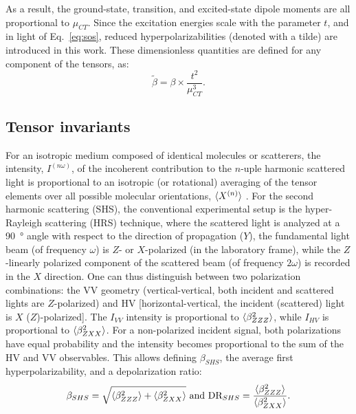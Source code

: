 \documentclass[journal=jpcafh]{achemso}
\begin{document}
As a result, the ground-state, transition, and excited-state dipole moments are all proportional to $ \mu_{CT}$. Since the excitation energies scale with the parameter $t$, and in light of Eq.~\eqref{eq:sos}, reduced hyperpolarizabilities (denoted with a tilde) are introduced in this work. These dimensionless quantities are defined for any component of the tensors, as:
\begin{equation}
	\tilde\beta = \beta \times \frac{t^2}{\mu_{CT}^3}. \label{eq:reduced}
\end{equation}

 
\subsection{Tensor invariants}

For an isotropic medium composed of identical molecules or scatterers, the intensity, $I^{(n\omega)}$, of the incoherent contribution to the $n$-uple harmonic scattered light is proportional to an isotropic (or rotational) averaging of the tensor elements over all possible molecular orientations, $\braket{X^{(n)}}$ \cite{Andrews1980,verbiest_second-order_2009,Castet2012,fordMolecularTensorAnalysis2018}.
For the second harmonic scattering (SHS), the conventional experimental setup is the hyper-Rayleigh scattering (HRS) technique\cite{verbiestSecondOrderNonlinearOptical2009}, where the scattered light is analyzed at a \SI{90}{\degree} angle with respect to the direction of propagation ($Y$), the fundamental light beam (of frequency $\omega$) is $Z$- or $X$-polarized (in the laboratory frame), while the $Z$-linearly polarized component of the scattered beam (of frequency $2\omega$) is recorded in the $X$ direction. One can thus distinguish between two polarization combinations: the VV geometry (vertical-vertical, both incident and scattered lights are $Z$-polarized) and HV [horizontal-vertical, the incident (scattered) light is $X$ ($Z$)-polarized]. The $I_{VV}$ intensity is proportional to $\braket{\beta_{ZZZ}^2}$, while $I_{HV}$ is proportional to $\braket{\beta_{ZXX}^2}$.
For a non-po\-la\-ri\-zed incident signal, both polarizations have equal probability and the intensity becomes proportional to the sum of the HV and VV observables. This allows defining $\beta_{SHS}$, the average first hyperpolarizability, and a depolarization ratio:\begin{align}
	\beta_{SHS} = \sqrt{\braket{\beta_{ZZZ}^2}+\braket{\beta_{ZXX}^2}} \text{ and } \text{DR}_{SHS} = \frac{\braket{\beta_{ZZZ}^2}}{\braket{\beta_{ZXX}^2}}.\label{eq:bhrs}
\end{align}
\end{document}
